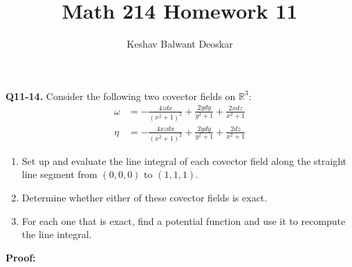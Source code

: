 \documentclass{article}
\title{Math 214 Homework 11}
\author{Keshav Balwant Deoskar}
\newcommand{\R}{\mathbb{R}}
\begin{document}
\maketitle



\textbf{Q11-14.} Consider the following two covector fields on $\R^3$:
\begin{align*}
  \omega &= -\frac{4z dx}{(x^2 + 1)^2} + \frac{2ydy}{y^2 + 1} + \frac{2xdz}{x^2 + 1} \\
  \eta &= -\frac{4xz dx}{(x^2 + 1)^2} + \frac{2y dy}{y^2 + 1} + \frac{2dz}{x^2 + 1}
\end{align*} 

\begin{enumerate}[label=(\alph*)]
  \item Set up and evaluate the line integral of each covector field along the straight line segment from $(0,0,0)$ to $(1,1,1)$.
  \item Determine whether either of these covector fields is exact.
  \item For each one that is exact, find a potential function and use it to recompute the line integral.
\end{enumerate}

\vskip 0.5cm
\textbf{Proof:}
\end{document}
